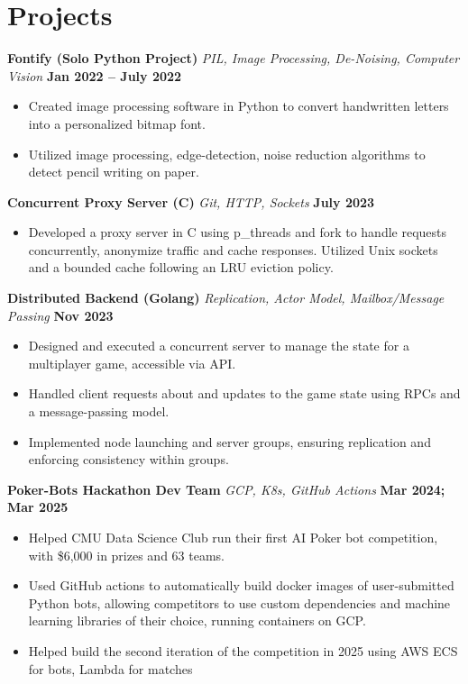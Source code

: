 \documentclass[fontsize=12pt]{scrartcl}
\begin{document}
\vspace{-12pt} %
\section{Projects}
\textbf{Fontify (Solo Python Project)} {\small\textit{PIL, Image Processing, De-Noising, Computer Vision}} \hfill \textbf{Jan 2022 -- July 2022}
\begin{itemize}
    \item Created image processing software in Python to convert handwritten letters into a personalized bitmap font.
    \item Utilized image processing, edge-detection, noise reduction algorithms to detect pencil writing on paper.
\end{itemize}

\textbf{Concurrent Proxy Server (C)} {\small\textit{Git, HTTP, Sockets}} \hfill \textbf{July 2023}
\begin{itemize}
    \item Developed a proxy server in C using p\_threads and fork to handle requests concurrently, anonymize traffic and cache responses. Utilized Unix sockets and a bounded cache following an LRU eviction policy.
\end{itemize}

\textbf{Distributed Backend (Golang)} {\small\textit{Replication, Actor Model, Mailbox/Message Passing}} \hfill \textbf{Nov 2023}
\begin{itemize}
    \item Designed and executed a concurrent server to manage the state for a multiplayer game, accessible via API\@.
    \item Handled client requests about and updates to the game state using RPCs and a message-passing model.
    \item Implemented node launching and server groups, ensuring replication and enforcing consistency within groups.
\end{itemize}

\textbf{Poker-Bots Hackathon Dev Team} {\small\textit{GCP, K8s, GitHub Actions}} \hfill \textbf{Mar 2024; Mar 2025}
\begin{itemize}
    \item Helped CMU Data Science Club run their first AI Poker bot competition, with \$6,000 in prizes and 63 teams.
    \item Used GitHub actions to automatically build docker images of user-submitted Python bots, allowing competitors to use custom dependencies and machine learning libraries of their choice, running containers on GCP\@.
    \item Helped build the second iteration of the competition in 2025 using AWS ECS for bots, Lambda for matches
\end{itemize}
\end{document}
